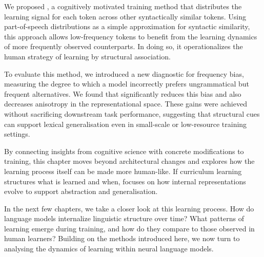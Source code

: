 We proposed \smoothing, a cognitively motivated training method that distributes the learning signal for each token across other syntactically similar tokens. Using part-of-speech distributions as a simple approximation for syntactic similarity, this approach allows low-frequency tokens to benefit from the learning dynamics of more frequently observed counterparts. In doing so, it operationalizes the human strategy of learning by structural association.

To evaluate this method, we introduced a new diagnostic for frequency bias, measuring the degree to which a model incorrectly prefers ungrammatical but frequent alternatives. We found that \smoothing significantly reduces this bias and also decreases anisotropy in the representational space. These gains were achieved without sacrificing downstream task performance, suggesting that structural cues can support lexical generalisation even in small-scale or low-resource training settings.

By connecting insights from cognitive science with concrete modifications to training, this chapter moves beyond architectural changes and explores how the learning process itself can be made more human-like. If curriculum learning structures what is learned and when, \smoothing focuses on how internal representations evolve to support abstraction and generalisation.

In the next few chapters, we take a closer look at this learning process. How do language models internalize linguistic structure over time? What patterns of learning emerge during training, and how do they compare to those observed in human learners? Building on the methods introduced here, we now turn to analysing the dynamics of learning within neural language models.
